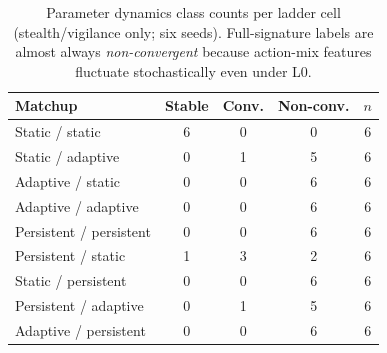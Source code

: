 \begin{table}[!t]
\caption{Parameter dynamics class counts per ladder cell (stealth/vigilance only; six seeds). Full-signature labels are almost always \emph{non-convergent} because action-mix features fluctuate stochastically even under L0.}
\label{tab:dynamics}
\centering
\setlength{\tabcolsep}{3pt}
\footnotesize
\begin{tabular}{@{}lcccc@{}}
\toprule
\textbf{Matchup} & \textbf{Stable} & \textbf{Conv.} & \textbf{Non-conv.} & $n$ \\
\midrule
Static / static          & 6 & 0 & 0 & 6 \\
Static / adaptive        & 0 & 1 & 5 & 6 \\
Adaptive / static        & 0 & 0 & 6 & 6 \\
Adaptive / adaptive      & 0 & 0 & 6 & 6 \\
Persistent / persistent  & 0 & 0 & 6 & 6 \\
Persistent / static      & 1 & 3 & 2 & 6 \\
Static / persistent      & 0 & 0 & 6 & 6 \\
Persistent / adaptive    & 0 & 1 & 5 & 6 \\
Adaptive / persistent    & 0 & 0 & 6 & 6 \\
\bottomrule
\end{tabular}
\end{table}
